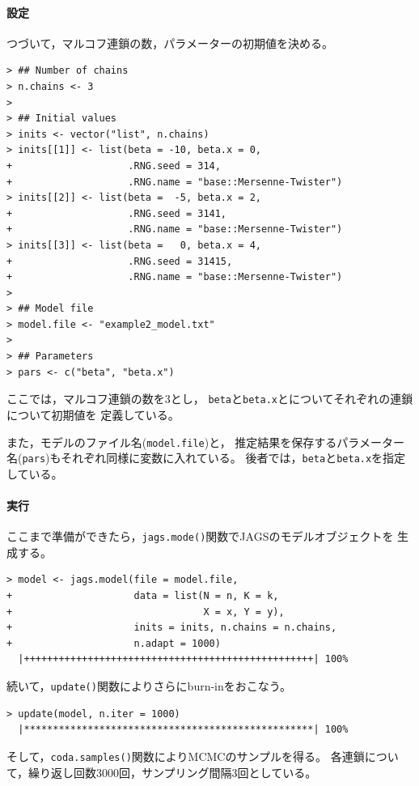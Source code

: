 \documentclass[11pt,uplatex]{jsarticle}
\begin{document}
\paragraph{設定}

つづいて，マルコフ連鎖の数，パラメーターの初期値を決める。
\begin{lstlisting}
> ## Number of chains
> n.chains <- 3
> 
> ## Initial values
> inits <- vector("list", n.chains)
> inits[[1]] <- list(beta = -10, beta.x = 0,
+                    .RNG.seed = 314,
+                    .RNG.name = "base::Mersenne-Twister")
> inits[[2]] <- list(beta =  -5, beta.x = 2,
+                    .RNG.seed = 3141,
+                    .RNG.name = "base::Mersenne-Twister")
> inits[[3]] <- list(beta =   0, beta.x = 4,
+                    .RNG.seed = 31415,
+                    .RNG.name = "base::Mersenne-Twister")
> 
> ## Model file
> model.file <- "example2_model.txt"
> 
> ## Parameters
> pars <- c("beta", "beta.x")
\end{lstlisting}
%
ここでは，マルコフ連鎖の数を3とし，
\texttt{beta}と\texttt{beta.x}とについてそれぞれの連鎖について初期値を
定義している。

また，モデルのファイル名(\texttt{model.file})と，
推定結果を保存するパラメーター名(\texttt{pars})もそれぞれ同様に変数に入れている。
後者では，\texttt{beta}と\texttt{beta.x}を指定している。

\paragraph{実行}

ここまで準備ができたら，\texttt{jags.mode()}関数でJAGSのモデルオブジェクトを
生成する。
\begin{lstlisting}
> model <- jags.model(file = model.file,
+                     data = list(N = n, K = k,
+                                 X = x, Y = y),
+                     inits = inits, n.chains = n.chains,
+                     n.adapt = 1000)
  |++++++++++++++++++++++++++++++++++++++++++++++++++| 100%
\end{lstlisting}

続いて，\texttt{update()}関数によりさらにburn-inをおこなう。
\begin{lstlisting}
> update(model, n.iter = 1000)
  |**************************************************| 100%
\end{lstlisting}

そして，\texttt{coda.samples()}関数によりMCMCのサンプルを得る。
各連鎖について，繰り返し回数3000回，サンプリング間隔3回としている。
\end{document}
